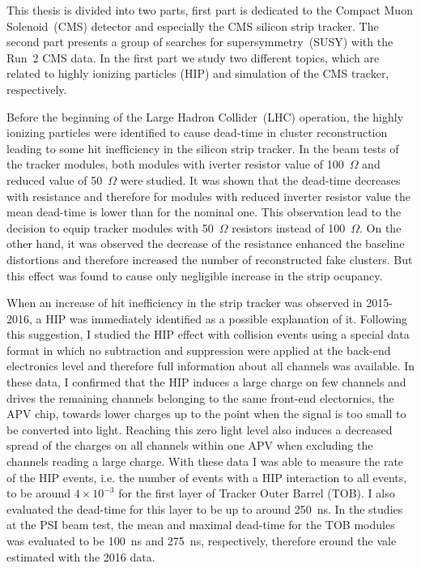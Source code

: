 


This thesis is divided into two parts, first part is dedicated to the Compact Muon Solenoid~(CMS) detector and especially the CMS silicon strip tracker. The second part presents a group of searches for supersymmetry~(SUSY) with the Run~2 CMS data. In the first part we study two different topics, which are related to highly ionizing particles (HIP) and simulation of the CMS tracker, respectively. 

Before the beginning of the Large Hadron Collider~(LHC) operation, the highly ionizing particles were identified to cause dead-time in cluster reconstruction leading to some hit inefficiency in the silicon strip tracker. In the beam tests of the tracker modules, both modules with iverter resistor value of 100~$\Omega$ and reduced value of 50~$\Omega$ were studied. It was shown that the dead-time decreases with resistance and therefore for modules with reduced inverter resistor value the mean dead-time is lower than for the nominal one. This observation lead to the decision to equip tracker modules with 50~$\Omega$ resistors instead of 100~$\Omega$. On the other hand, it was observed the decrease of the resistance enhanced the baseline distortions and therefore increased the number of reconstructed fake clusters. But this effect was found to cause only negligible increase in the strip ocupancy. 

When an increase of hit inefficiency in the strip tracker was observed in 2015-2016, a HIP was immediately identified as a possible explanation of it. Following this suggestion, I studied the HIP effect with collision events using a special data format in which no subtraction and suppression were applied at the back-end electronics level and therefore full information about all channels was available. In these data, I confirmed that the HIP induces a large charge on few channels and drives the remaining channels belonging to the same front-end electornics, the APV chip, towards lower charges up to the point when the signal is too small to be converted into light. Reaching this zero light level also induces a decreased spread of the charges on all channels within one APV when excluding the channels reading a large charge. With these data I was able to measure the rate of the HIP events, i.e. the number of events with a HIP interaction to all events, to be around $4 \times 10^{-3}$ for the first layer of Tracker Outer Barrel (TOB). I also evaluated the dead-time for this layer to be up to around 250~ns. In the studies at the PSI beam test, the mean and maximal dead-time for the TOB modules was evaluated to be 100~ns and 275~ns, respectively, therefore eround the vale estimated with the 2016 data.  

